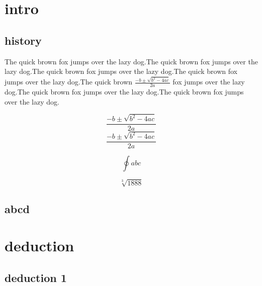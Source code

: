 \documentclass{book}    %
\begin{document}
\chapter{intro}
\section{history}
The quick brown fox jumps over the lazy dog.The quick brown fox jumps over the lazy dog.The quick brown fox jumps over the lazy dog.The quick brown fox jumps over the lazy dog.The quick brown
$\frac{{- b \pm \sqrt {{b^2} - 4ac} }}{2a}$ fox jumps over the lazy dog.The quick brown fox jumps over the lazy dog.The quick brown fox jumps over the lazy dog.


$$\frac{{- b \pm \sqrt {{b^2} - 4ac} }}{2a}$$       %
\[\frac{{- b \pm \sqrt {{b^2}  -4ac} }}{2a}\]

$$\oint{abc}$$

$$\sqrt[3]{1888}$$



\section{abcd}

\chapter{deduction}
\section{deduction 1}
\end{document}
